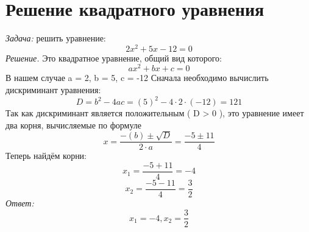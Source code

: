 \documentclass[a4paper, 12pt]{article}
\begin{document}
\section{Решение квадратного уравнения}
\textit{Задача:} решить уравнение: 
\[2x^2 + 5x - 12 = 0\]
\textit{Решение.}
Это квадратное уравнение, общий вид которого:
\[ax^2 + bx + c = 0\]
В нашем случае a = 2, b = 5, c = -12 
Сначала необходимо вычислить дискриминант уравнения:
\[D = b^2 - 4ac = (5)^2 - 4 \cdot 2 \cdot (-12) = 121\]
Так как дискриминант является положительным ( D > 0 ), это уравнение имеет два корня, вычисляемые по формуле
\[x = \frac{-(b) \pm \sqrt{D}}{2 \cdot a} = \frac{-5 \pm 11}{4}\]
Теперь найдём корни:
\[x_1 = \frac{-5 + 11}{4} = -4\]
\[x_2 = \frac{-5 - 11}{4} = \frac{3}{2}\]
\textit{Ответ:} \[x_1 = -4, x_2 = \frac{3}{2}\]
\end{document}
